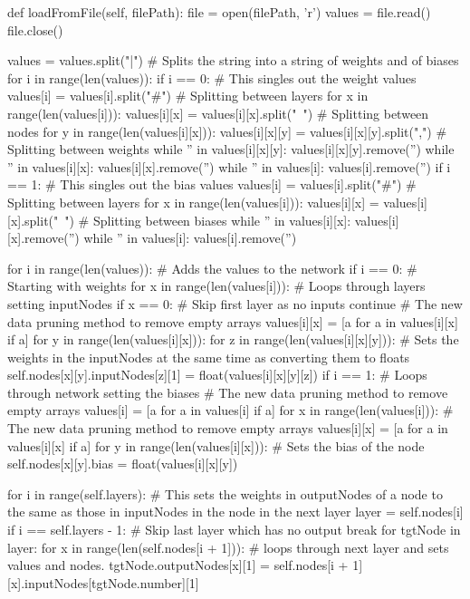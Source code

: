 \documentclass{report}
\begin{document}
\begin{python}
def loadFromFile(self, filePath):
    file = open(filePath, 'r')
    values = file.read()
    file.close()

    values = values.split("|")  # Splits the string into a string of weights and of biases
    for i in range(len(values)):
        if i == 0:  # This singles out the weight values
            values[i] = values[i].split("#")  # Splitting between layers
            for x in range(len(values[i])):
                values[i][x] = values[i][x].split("~")  # Splitting between nodes
                for y in range(len(values[i][x])):
                    values[i][x][y] = values[i][x][y].split(",")  # Splitting between weights
                    while '' in values[i][x][y]:
                        values[i][x][y].remove('')
                while '' in values[i][x]:
                    values[i][x].remove('')
            while '' in values[i]:
                values[i].remove('')
        if i == 1:  # This singles out the bias values
            values[i] = values[i].split("#")  # Splitting between layers
            for x in range(len(values[i])):
                values[i][x] = values[i][x].split("~")  # Splitting between biases
                while '' in values[i][x]:
                    values[i][x].remove('')
            while '' in values[i]:
                values[i].remove('')

    for i in range(len(values)):  # Adds the values to the network
        if i == 0:  # Starting with weights
            for x in range(len(values[i])):  # Loops through layers setting inputNodes
                if x == 0:  # Skip first layer as no inputs
                    continue
                # The new data pruning method to remove empty arrays
                values[i][x] = [a for a in values[i][x] if a]
                for y in range(len(values[i][x])):
                    for z in range(len(values[i][x][y])):
                        # Sets the weights in the inputNodes at the same time as converting them to floats
                        self.nodes[x][y].inputNodes[z][1] = float(values[i][x][y][z])
        if i == 1:  # Loops through network setting the biases
            # The new data pruning method to remove empty arrays
            values[i] = [a for a in values[i] if a]
            for x in range(len(values[i])):
                # The new data pruning method to remove empty arrays
                values[i][x] = [a for a in values[i][x] if a]
                for y in range(len(values[i][x])):
                    # Sets the bias of the node
                    self.nodes[x][y].bias = float(values[i][x][y])

    for i in range(self.layers):  # This sets the weights in outputNodes of a node to the same as those in inputNodes in the node in the next layer
        layer = self.nodes[i]
        if i == self.layers - 1:  # Skip last layer which has no output
            break
        for tgtNode in layer:
            for x in range(len(self.nodes[i + 1])):
                # loops through next layer and sets values and nodes.
                tgtNode.outputNodes[x][1] = self.nodes[i + 1][x].inputNodes[tgtNode.number][1]
\end{python}
\end{document}
